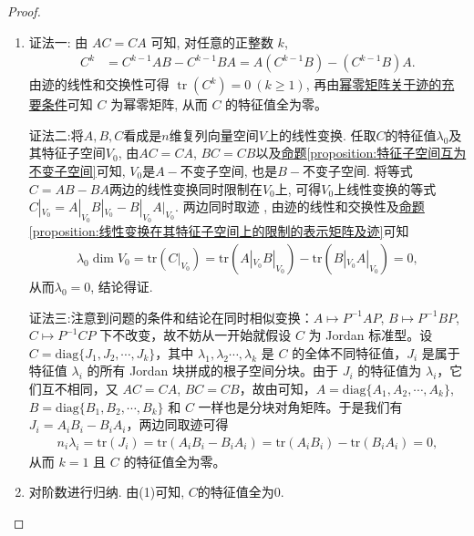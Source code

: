 \documentclass[../../main.tex]{subfiles}%
\begin{document}
\begin{proof}
\begin{enumerate}[(1)]
\item {\color{blue}证法一:}
由 \(AC = CA\) 可知, 对任意的正整数 \(k\),
\begin{align*}
C^k &= C^{k-1}AB - C^{k-1}BA = A(C^{k-1}B) - (C^{k-1}B)A.
\end{align*}
由迹的线性和交换性可得 \(\operatorname{tr}(C^k) = 0 \ (k \geqslant  1)\), 再由\hyperref[theorem:幂零矩阵关于迹的充要条件]{幂零矩阵关于迹的充要条件}可知 \(C\) 为幂零矩阵, 从而 \(C\) 的特征值全为零。

{\color{blue}证法二:}将\(A,B,C\)看成是\(n\)维复列向量空间\(V\)上的线性变换. 任取\(C\)的特征值\(\lambda_{0}\)及其特征子空间\(V_{0}\), 由\(AC = CA\), \(BC = CB\)以及\hyperref[proposition:特征子空间互为不变子空间]{命题\ref{proposition:特征子空间互为不变子空间}}可知, \(V_{0}\)是\(A -\)不变子空间, 也是\(B -\)不变子空间. 将等式\(C = AB - BA\)两边的线性变换同时限制在\(V_{0}\)上, 可得\(V_{0}\)上线性变换的等式\(C|_{V_{0}}=A|_{V_{0}}B|_{V_{0}}-B|_{V_{0}}A|_{V_{0}}\). 两边同时取迹 , 由迹的线性和交换性及\hyperref[proposition:线性变换在其特征子空间上的限制的表示矩阵及迹]{命题\ref{proposition:线性变换在其特征子空间上的限制的表示矩阵及迹}}可知
\begin{align*}
\lambda_{0}\dim V_{0}=\mathrm{tr}(C|_{V_{0}})=\mathrm{tr}(A|_{V_{0}}B|_{V_{0}})-\mathrm{tr}(B|_{V_{0}}A|_{V_{0}})=0,
\end{align*}
从而\(\lambda_{0}=0\), 结论得证.

{\color{blue}证法三:}注意到问题的条件和结论在同时相似变换：$A \mapsto P^{-1}AP$, $B \mapsto P^{-1}BP$, $C \mapsto P^{-1}CP$ 下不改变，故不妨从一开始就假设 $C$ 为 Jordan 标准型。设 $C = \mathrm{diag}\{J_1, J_2, \cdots, J_k\}$，其中 $\lambda_1, \lambda_2 \cdots, \lambda_k$ 是 $C$ 的全体不同特征值，$J_i$ 是属于特征值 $\lambda_i$ 的所有 Jordan 块拼成的根子空间分块。由于 $J_i$ 的特征值为 $\lambda_i$，它们互不相同，又 $AC = CA$, $BC = CB$，故由可知，$A = \mathrm{diag}\{A_1, A_2, \cdots, A_k\}$, $B = \mathrm{diag}\{B_1, B_2, \cdots, B_k\}$ 和 $C$ 一样也是分块对角矩阵。于是我们有 $J_i = A_iB_i - B_iA_i$，两边同取迹可得
\begin{align*}
n_i\lambda_i = \mathrm{tr}(J_i) = \mathrm{tr}(A_iB_i - B_iA_i) = \mathrm{tr}(A_iB_i) - \mathrm{tr}(B_iA_i) = 0,
\end{align*}
从而 $k = 1$ 且 $C$ 的特征值全为零。

\item 对阶数进行归纳. 由(1)可知, \(C\)的特征值全为\(0\).


\end{enumerate}
\end{proof}
\end{document}
